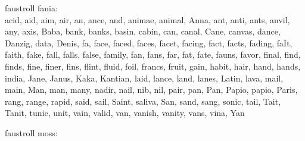 faustroll fania:\\
acid, aid, aim, air, an, ance, and, animae, animal, Anna, ant, anti, ants, anvil, any, axis, Baba, bank, banks, basin, cabin, can, canal, Cane, canvas, dance, Danzig, data, Denis, fa, face, faced, faces, facet, facing, fact, facts, fading, faIt, faith, fake, fall, falls, false, family, fan, fans, far, fat, fate, fauns, favor, final, find, finds, fine, finer, fins, flint, fluid, foil, francs, fruit, gain, habit, hair, hand, hands, india, Jane, Janus, Kaka, Kantian, laid, lance, land, lanes, Latin, lava, mail, main, Man, man, many, nadir, nail, nib, nil, pair, pan, Pan, Papio, papio, Paris, rang, range, rapid, said, sail, Saint, saliva, San, sand, sang, sonic, tail, Tait, Tanit, tunic, unit, vain, valid, van, vanish, vanity, vans, vina, Yan

faustroll moss:\\
